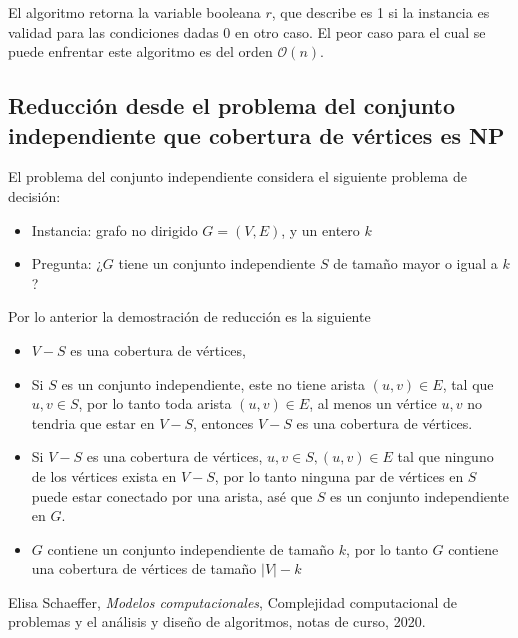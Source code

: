 \documentclass[letterpaper,11pt]{article}
\begin{document}
El algoritmo retorna la variable booleana $r$, que describe es 1 si la instancia es validad para las condiciones dadas 0 en otro caso. El peor caso para el cual se puede enfrentar este algoritmo es del orden $\mathcal{O}(n)$.


\subsection{Reducción desde el problema del conjunto independiente que cobertura de vértices es NP}

El problema del conjunto independiente considera el siguiente problema de decisión:
\begin{itemize}
\item Instancia: grafo no dirigido $G=(V,E)$, y un entero $k$
\item Pregunta: ¿$G$ tiene un conjunto independiente $S$ de tamaño mayor o igual a $k$? 
\end{itemize}

Por lo anterior la demostración de reducción es la siguiente

\begin{itemize}
\item $V-S$ es una cobertura de vértices,
\item Si $S$ es un conjunto independiente, este no tiene arista $(u,v)\in E$, tal que $u,v \in S$, por lo tanto toda arista $(u,v)\in E$, al menos un vértice 	$u,v$ no tendria que estar en $V-S$, entonces $V-S$ es una cobertura de vértices.
\item Si $V-S$ es una cobertura de vértices, $u,v\in S, (u,v) \in E$ tal que ninguno de los vértices exista en $V-S$, por lo tanto ninguna par de vértices en $S$ puede estar conectado por una arista, asé que $S$ es un conjunto independiente en $G$.
\item $G$ contiene un conjunto independiente de tamaño $k$, por lo tanto $G$ contiene una cobertura de vértices de tamaño $|V|-k$
 

\end{itemize}


\begin{thebibliography}{0}
   Elisa Schaeffer, \textit{Modelos computacionales}, Complejidad computacional de problemas y el análisis y diseño de algoritmos, notas de curso, 2020.
\end{thebibliography}
\end{document}
